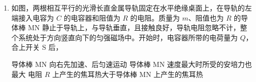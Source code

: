 \documentclass[\gkver]{gaokaozhenti}
\begin{document}
\begin{enumerate}
{故 P 加速度大小的最大值是刚撤去拉力瞬间的加速度为 $2\mu g$。

Q 加速度大小最大值为弹簧恢复原长时

$-\mu mg=ma_{Qm}$

解得

$a_{Qm}=-\mu g$

故滑块 Q 加速度大小最大值为 $\mu g$，A 正确，B 错误；

C．滑块 PQ 水平向右运动，PQ 间的距离在减小，故 P 的位移一定小于 Q 的位移，C 错误；

D．滑块 P 在弹簧恢复到原长时的加速度为

$-\mu mg=ma_{P2}$

解得

$a_{P2}=-\mu g$

撤去拉力时，PQ 的初速度相等，滑块 P 由开始的加速度大小为 $2\mu g$ 做加速度减小的减速运动，最后弹簧原长时加速度大小为 $\mu g$；滑块 Q 由开始的加速度为 0 做加速度增大的减速运动，最后弹簧原长时加速度大小也为 $\mu g$。分析可知 P 的速度大小均不大于同一时刻 Q 的速度大小，D 正确。

故选 AD。
}

\item
如图，两根相互平行的光滑长直金属导轨固定在水平绝缘桌面上，在导轨的左端接入电容为 $C$ 的电容器和阻值为 $R$ 的电阻。质量为 $m$、阻值也为 $R$ 的导体棒 MN 静止于导轨上，与导轨垂直，且接触良好，导轨电阻忽略不计，整个系统处于方向竖直向下的匀强磁场中。开始时，电容器所带的电荷量为 $Q$，合上开关 S 后，


{导体棒 MN 向右先加速、后匀速运动}
{导体棒 MN 速度最大时所受的安培力也最大}
{电阻 $R$ 上产生的焦耳热大于导体棒 MN 上产生的焦耳热}

\end{enumerate}
\end{document}

